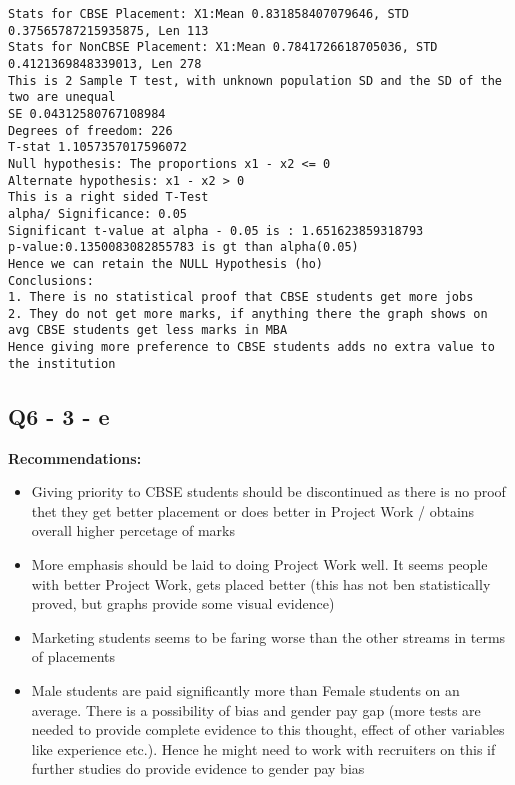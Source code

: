 \documentclass[11pt]{article}
\providecommand{\tightlist}{%
      \setlength{\itemsep}{0pt}\setlength{\parskip}{0pt}}
\begin{document}
    \begin{Verbatim}[commandchars=\\\{\}]
Stats for CBSE Placement: X1:Mean 0.831858407079646, STD 0.37565787215935875, Len 113
Stats for NonCBSE Placement: X1:Mean 0.7841726618705036, STD 0.4121369848339013, Len 278
This is 2 Sample T test, with unknown population SD and the SD of the two are unequal
SE 0.04312580767108984
Degrees of freedom: 226
T-stat 1.1057357017596072
Null hypothesis: The proportions x1 - x2 <= 0
Alternate hypothesis: x1 - x2 > 0
This is a right sided T-Test
alpha/ Significance: 0.05
Significant t-value at alpha - 0.05 is : 1.651623859318793
p-value:0.1350083082855783 is gt than alpha(0.05)
Hence we can retain the NULL Hypothesis (ho)
Conclusions:
1. There is no statistical proof that CBSE students get more jobs
2. They do not get more marks, if anything there the graph shows on avg CBSE students get less marks in MBA
Hence giving more preference to CBSE students adds no extra value to the institution

    \end{Verbatim}

    \subsection{Q6 - 3 - e}\label{q6---3---e}

    \textbf{Recommendations:}

\begin{itemize}
\tightlist
\item
  Giving priority to CBSE students should be discontinued as there is no
  proof thet they get better placement or does better in Project Work /
  obtains overall higher percetage of marks
\item
  More emphasis should be laid to doing Project Work well. It seems
  people with better Project Work, gets placed better (this has not ben
  statistically proved, but graphs provide some visual evidence)
\item
  Marketing students seems to be faring worse than the other streams in
  terms of placements
\item
  Male students are paid significantly more than Female students on an
  average. There is a possibility of bias and gender pay gap (more tests
  are needed to provide complete evidence to this thought, effect of
  other variables like experience etc.). Hence he might need to work
  with recruiters on this if further studies do provide evidence to
  gender pay bias
\end{itemize}
\end{document}
